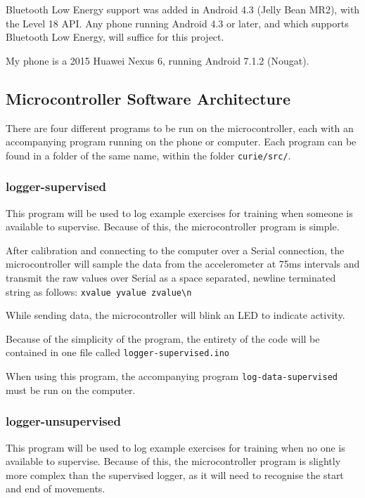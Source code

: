 \documentclass[a4paper]{article}
\begin{document}
Bluetooth Low Energy support was added in Android 4.3 (Jelly Bean MR2), with the Level 18 API.\cite{dsref6} Any phone running Android 4.3 or later, and which supports Bluetooth Low Energy, will suffice for this project.

My phone is a 2015 Huawei Nexus 6, running Android 7.1.2 (Nougat).


\subsection{Microcontroller Software Architecture}%

There are four different programs to be run on the microcontroller, each with an accompanying program running on the phone or computer. Each program can be found in a folder of the same name, within the folder \lstinline{curie/src/}.

\subsubsection{logger-supervised}

This program will be used to log example exercises for training when someone is available to supervise. Because of this, the microcontroller program is simple.

After calibration and connecting to the computer over a Serial connection, the microcontroller will sample the data from the accelerometer at 75ms intervals and transmit the raw values over Serial as a space separated, newline terminated string as follows:
\lstinline|xvalue yvalue zvalue\n|

While sending data, the microcontroller will blink an LED to indicate activity.

Because of the simplicity of the program, the entirety of the code will be contained in one file called \lstinline{logger-supervised.ino}

When using this program, the accompanying program \lstinline{log-data-supervised} must be run on the computer.

\subsubsection{logger-unsupervised}

This program will be used to log example exercises for training when no one is available to supervise. Because of this, the microcontroller program is slightly more complex than the supervised logger, as it will need to recognise the start and end of movements.
\end{document}
